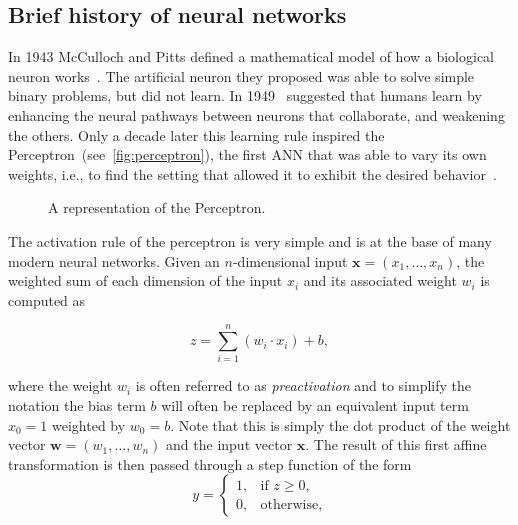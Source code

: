 \subsection{Brief history of neural networks}
In 1943 McCulloch and Pitts defined a mathematical model of how a biological
neuron works~\citep{McCulloch43}. The artificial neuron they proposed was
able to solve simple binary problems, but did not learn. In 1949~\cite{Hebb49}
suggested that humans learn by enhancing the neural pathways between neurons
that collaborate, and weakening the others. Only a decade later this learning
rule inspired the Perceptron~(see~\autoref{fig:perceptron}), the first ANN that
was able to vary its own weights, i.e., to find the setting that allowed it to
exhibit the desired behavior~\citep{Rosenblatt57}.

\begin{figure}[t]
    \centering
    \begin{neuralnetwork} [nodespacing=6mm, layerspacing=23mm,
            maintitleheight=2.5em, layertitleheight=5em,
            height=3, toprow=true, nodesize=17pt,
            style={}, title={}, titlestyle={}]

        \outputlayer[count=1, text=\nodetextsigma]
        {\setdefaultlinklabel{\wilink}\linklayers}
        \redefinelayerspacing{18mm}
        \outputlayer[count=1, text=\nodetextstep]
        \linklayers
        \redefinelayerspacing{16mm}
        \outputlayer[count=1, text=\nodetexty]
        \linklayers
    \end{neuralnetwork}
    \centering
    \caption{\label{fig:perceptron}A representation of the Perceptron.}
\end{figure}

The activation rule of the perceptron is very simple and is at the base of many
modern neural networks. Given an $n$-dimensional input $\mathbf{x} = (x_1,
\dots, x_n)$, the weighted sum of each dimension of the input $x_i$ and its
associated weight $w_i$ is computed as

\begin{equation*}
    z = \sum_{i=1}^{n}(w_i \cdot x_i) + b,
\end{equation*}

\noindent where the weight $w_i$ is often referred to as \emph{preactivation}
and to simplify the notation the bias term $b$ will often be replaced by an
equivalent input term $x_0=1$ weighted by $w_0=b$. Note that this is simply the
dot product of the weight vector $\mathbf{w} = (w_1, \dots, w_n)$ and the input
vector $\mathbf{x}$. The result of this first affine transformation is then
passed through a step function of the form
\begin{equation*}
    y =
        \begin{cases}
            1,          & \text{if } z \geq 0 ,\\
            0,         & \text{otherwise},
        \end{cases}
\end{equation*}

